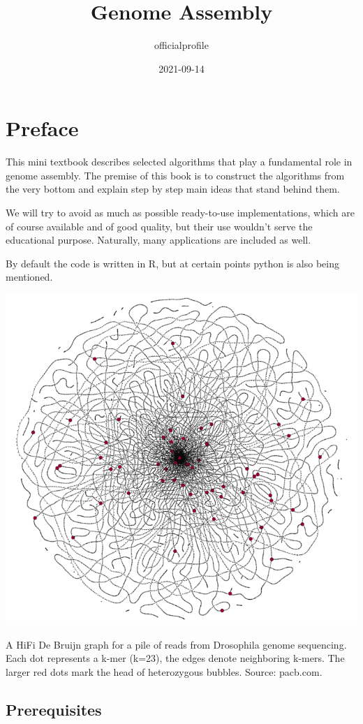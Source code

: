 \documentclass[
]{book}
\title{Genome Assembly}
\author{officialprofile}
\date{2021-09-14}
\begin{document}
\maketitle

{
\setcounter{tocdepth}{1}
\tableofcontents
}
\hypertarget{preface}{%
\chapter{Preface}\label{preface}}

This mini textbook describes selected algorithms that play a fundamental role in genome assembly. The premise of this book is to construct the algorithms from the very bottom and explain step by step main ideas that stand behind them.

We will try to avoid as much as possible ready-to-use implementations, which are of course available and of good quality, but their use wouldn't serve the educational purpose. Naturally, many applications are included as well.

By default the code is written in R, but at certain points python is also being mentioned.

\begin{center}\includegraphics[width=0.8\linewidth]{img/cover} \end{center}

A HiFi De Bruijn graph for a pile of reads from Drosophila genome sequencing. Each dot represents a k-mer (k=23), the edges denote neighboring k-mers. The larger red dots mark the head of heterozygous bubbles. Source: pacb.com.

\hypertarget{prerequisites}{%
\section{Prerequisites}\label{prerequisites}}
\end{document}

